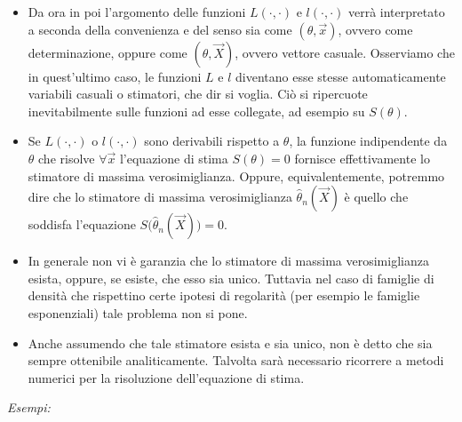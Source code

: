 \begin{itemize}
\item Da ora in poi l'argomento delle funzioni $L(\cdot,\cdot)$ e $l(\cdot,\cdot)$ verrà interpretato a seconda della convenienza e del senso sia come $(\theta,\vec{x})$, ovvero come determinazione, oppure come $(\theta, \vec{X})$, ovvero vettore casuale. Osserviamo che in quest'ultimo caso, le funzioni $L$ e $l$ diventano esse stesse automaticamente variabili casuali o stimatori, che dir si voglia. Ciò si ripercuote inevitabilmente sulle funzioni ad esse collegate, ad esempio su $S(\theta)$.
\item Se $L(\cdot,\cdot)$ o $l(\cdot,\cdot)$ sono derivabili rispetto a $\theta$, la funzione indipendente da $\theta$ che risolve $\forall \vec{x}$ l'equazione di stima $S(\theta)=0$ fornisce effettivamente lo stimatore di massima verosimiglianza. Oppure, equivalentemente, potremmo dire che lo stimatore di massima verosimiglianza $\hat{\theta}_n(\vec{X})$ è quello che soddisfa l'equazione $S\big(\hat{\theta}_n(\vec{X})\big)=0$.
\item In generale non vi è garanzia che lo stimatore di massima verosimiglianza esista, oppure, se esiste, che esso sia unico. Tuttavia nel caso di famiglie di densità che rispettino certe ipotesi di regolarità (per esempio le famiglie esponenziali) tale problema non si pone.
\item Anche assumendo che tale stimatore esista e sia unico, non è detto che sia sempre ottenibile analiticamente. Talvolta sarà necessario ricorrere a metodi numerici per la risoluzione dell'equazione di stima.
\end{itemize}
\textit{Esempi:}
